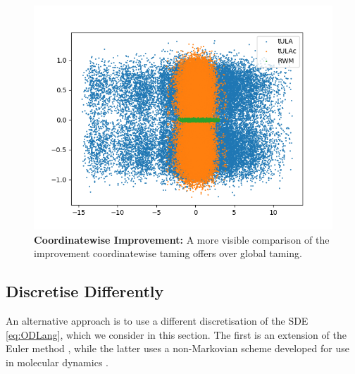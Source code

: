 \begin{figure}[H]
\centering
  \begin{minipage}[b]{0.49\textwidth}
  \centering
    \includegraphics[width=\textwidth]{Figures/transparentBoth.png}
  \end{minipage} %
   \caption{\textbf{Coordinatewise Improvement:} A more visible comparison of the improvement coordinatewise taming offers over global taming.}
   \label{fig:stifftULAc}
\end{figure}




\subsection{Discretise Differently}
An alternative approach is to use a different discretisation of the SDE \eqref{eq:ODLang}, which we consider in this section. The first is an extension of the Euler method \cite{Sabanis18tHOLA}, while the latter uses a non-Markovian scheme developed for use in molecular dynamics \cite{LM12}.
